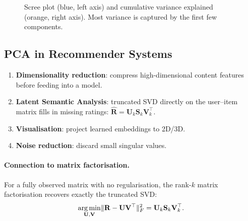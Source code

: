 \begin{figure}[h]
\centering
{}
\caption{Scree plot (blue, left axis) and cumulative variance explained (orange,
right axis). Most variance is captured by the first few components.}
\label{fig:scree}
\end{figure}

\subsection{PCA in Recommender Systems}

\begin{enumerate}
\item \textbf{Dimensionality reduction}: compress high-dimensional content
  features before feeding into a model.
\item \textbf{Latent Semantic Analysis}: truncated SVD directly on the
  user--item matrix fills in missing ratings:
  $\hat{\mathbf{R}}=\mathbf{U}_k\mathbf{S}_k\mathbf{V}_k^{\top}$.
\item \textbf{Visualisation}: project learned embeddings to 2D/3D.
\item \textbf{Noise reduction}: discard small singular values.
\end{enumerate}

\paragraph{Connection to matrix factorisation.}
For a fully observed matrix with no regularisation, the rank-$k$ matrix
factorisation recovers exactly the truncated SVD:
\[\underset{\mathbf{U},\mathbf{V}}{\operatorname*{arg\,min}}
\|\mathbf{R}-\mathbf{U}\mathbf{V}^{\top}\|_F^2
=\mathbf{U}_k\mathbf{S}_k\mathbf{V}_k^{\top}.\]

